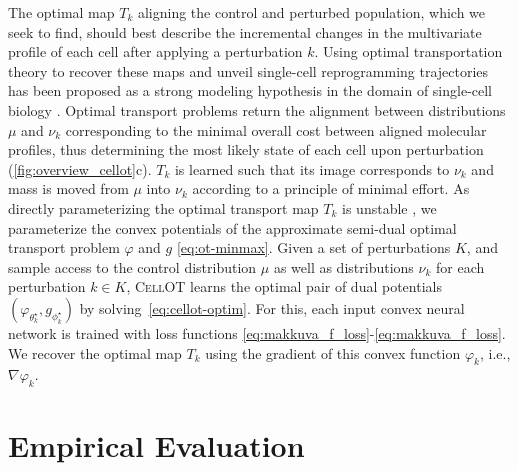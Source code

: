  The optimal map $T_k$ aligning the control and perturbed population, which we seek to find, should best describe the incremental changes in the multivariate profile of each cell after applying a perturbation $k$. Using optimal transportation theory \citep{villani2021topics, santambrogio2015optimal} to recover these maps and unveil single-cell reprogramming trajectories has been proposed as a strong modeling hypothesis in the domain of single-cell biology \citep{schiebinger2019optimal, cang2020inferring, demetci2022scot, huizing2022optimal, lavenant2021towards, zhang2021optimal}.
Optimal transport problems return the alignment between distributions $\mu$ and $\nu_k$ corresponding to the minimal overall cost between aligned molecular profiles, thus determining the most likely state of each cell upon perturbation (\cref{fig:overview_cellot}c).
$T_k$ is learned such that its image corresponds to $\nu_k$ and mass is moved from $\mu$ into $\nu_k$ according to a principle of minimal effort.
As directly parameterizing the optimal transport map $T_k$ \citep{korotin2021wasserstein, yang2018scalable, prasad2020optimal} is unstable \citep[Table 1]{makkuva2020optimal}, we parameterize the convex potentials of the approximate semi-dual optimal transport problem $\varphi$ and $g$ \eqref{eq:ot-minmax}.
Given a set of perturbations $K$, and sample access to the control distribution $\mu$ as well as  distributions $\nu_k$ for each perturbation $k \in K$, \textsc{CellOT} learns the optimal pair of dual potentials $(\varphi_{\theta_k^\star}, g_{\phi_k^\star})$ by solving~\eqref{eq:cellot-optim}.
For this, each input convex neural network \citep{amos2017input} is trained with loss functions \eqref{eq:makkuva_f_loss}-\eqref{eq:makkuva_f_loss}. We recover the optimal map $T_k$ using the gradient of this convex function $\varphi_k$, i.e., $\nabla \varphi_k$.

\section{Empirical Evaluation}

